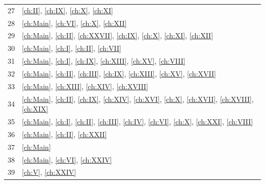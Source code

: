 \begin{center}
\begin{tabular}{rl}
27 & \ref{ch:II}, \ref{ch:IX}, \ref{ch:X}, \ref{ch:XI}\\
28 & \ref{ch:Main}, \ref{ch:VI}, \ref{ch:X}, \ref{ch:XII}\\
29 & \ref{ch:Main}, \ref{ch:II}, \ref{ch:XXVII}, \ref{ch:IX}, \ref{ch:X}, \ref{ch:XI}, \ref{ch:XII}\\
30 & \ref{ch:Main}, \ref{ch:I}, \ref{ch:II}, \ref{ch:VII}\\
31 & \ref{ch:Main}, \ref{ch:I}, \ref{ch:IX}, \ref{ch:XIII}, \ref{ch:XV}, \ref{ch:VIII}\\
32 & \ref{ch:Main}, \ref{ch:II}, \ref{ch:III}, \ref{ch:IX}, \ref{ch:XIII}, \ref{ch:XV}, \ref{ch:XVII}\\
33 & \ref{ch:Main}, \ref{ch:XIII}, \ref{ch:XIV}, \ref{ch:XVIII}\\
34 & \ref{ch:Main}, \ref{ch:II}, \ref{ch:IX}, \ref{ch:XIV}, \ref{ch:XVI}, \ref{ch:X}, \ref{ch:XVII}, \ref{ch:XVIII}, \ref{ch:XIX}\\
35 & \ref{ch:Main}, \ref{ch:I}, \ref{ch:II}, \ref{ch:III}, \ref{ch:IV}, \ref{ch:VI}, \ref{ch:X}, \ref{ch:XXI}, \ref{ch:VIII}\\
36 & \ref{ch:Main}, \ref{ch:II}, \ref{ch:XXII}\\
37 & \ref{ch:Main}\\
38 & \ref{ch:Main}, \ref{ch:VI}, \ref{ch:XXIV}\\
39 & \ref{ch:V}, \ref{ch:XXIV}\\
\hline
\end{tabular}
\end{center}
